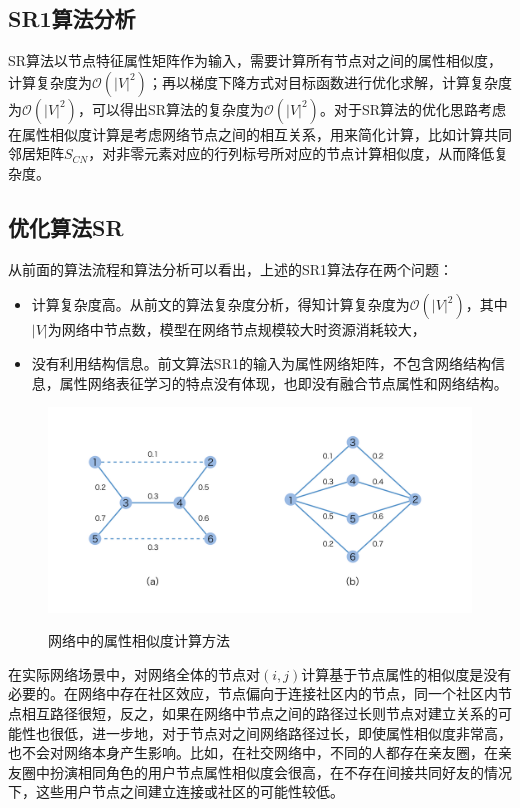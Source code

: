 \subsection{SR1算法分析}
SR算法以节点特征属性矩阵作为输入，需要计算所有节点对之间的属性相似度，计算复杂度为$\mathcal{O}(|V|^2)$；再以梯度下降方式对目标函数进行优化求解，计算复杂度为$\mathcal{O}(|V|^2)$，可以得出SR算法的复杂度为$\mathcal{O}(|V|^2)$。对于SR算法的优化思路考虑在属性相似度计算是考虑网络节点之间的相互关系，用来简化计算，比如计算共同邻居矩阵$S_{CN}$，对非零元素对应的行列标号所对应的节点计算相似度，从而降低复杂度。

\subsection{优化算法SR}
从前面的算法流程和算法分析可以看出，上述的SR1算法存在两个问题：
\begin{itemize}
	\item 计算复杂度高。从前文的算法复杂度分析，得知计算复杂度为$\mathcal{O}(|V|^2)$，其中$|V|$为网络中节点数，模型在网络节点规模较大时资源消耗较大，
	\item 没有利用结构信息。前文算法SR1的输入为属性网络矩阵，不包含网络结构信息，属性网络表征学习的特点没有体现，也即没有融合节点属性和网络结构。
\end{itemize}
\begin{figure}[!ht]
	\begin{center}
		{\includegraphics[width=5in]{figures/similar_opt.png}}
		\caption{网络中的属性相似度计算方法}
	\end{center}
\end{figure}
在实际网络场景中，对网络全体的节点对$(i,j)$计算基于节点属性的相似度是没有必要的。在网络中存在社区效应，节点偏向于连接社区内的节点，同一个社区内节点相互路径很短，反之，如果在网络中节点之间的路径过长则节点对建立关系的可能性也很低，进一步地，对于节点对之间网络路径过长，即使属性相似度非常高，也不会对网络本身产生影响。比如，在社交网络中，不同的人都存在亲友圈，在亲友圈中扮演相同角色的用户节点属性相似度会很高，在不存在间接共同好友的情况下，这些用户节点之间建立连接或社区的可能性较低。


